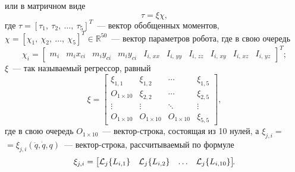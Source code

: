 или в матричном виде
\begin{equation}\label{eq_dynamic_in_linear}
    \tau = \xi \chi,
\end{equation}
где $\tau = [\tau_1, \: \tau_2, \: \ldots, \: \tau_5]^T$~--- вектор обобщенных моментов,\\ $\chi=[\chi_1, \: \chi_2, \: \ldots, \: \chi_5]^T \in \mathbb R^{50}$~--- вектор параметров робота, где в свою очередь
\begin{equation}
    \chi_i =
    \begin{bmatrix}
        m_i & m_i x_{ci} & m_i y_{ci} & m_i y_{ci} & I_{i,\,xx} & I_{i,\,yy} & I_{i,\,zz} & I_{i,\,xy} & I_{i,\,xz} & I_{i,\,yz}
    \end{bmatrix}^T\!\!\!\!;
\end{equation}
$\xi$~--- так называемый регрессор, равный
\begin{equation}
    \xi =
    \begin{bmatrix}
        \xi_{1,1} & \xi_{1,2} & \cdots & \xi_{1,5} \\
        O_{1 \times 10} & \xi_{2,2} & \cdots & \xi_{2,5} \\
        \vdots & \vdots & \ddots & \vdots \\
        O_{1 \times 10} & O_{1 \times 10} & O_{1 \times 10} & \xi_{5,5}
    \end{bmatrix}\!\!,
\end{equation}
где в свою очередь $O_{1 \times 10}$~--- вектор-строка, состоящая из 10 нулей, а $\xi_{j,i} =$\linebreak $= \xi_{j,i}(\ddot{q}, \dot{q}, q)$~--- вектор-строка, рассчитываемый по формуле
\begin{equation}
    \xi_{j,i} =
    \begin{bmatrix}
        \mathcal{L}_j \{L_{i,1}\} & \mathcal{L}_j \{L_{i,2}\} & \ldots & \mathcal{L}_j \{L_{i,10}\}
    \end{bmatrix}\!\!\ldotp
\end{equation}

